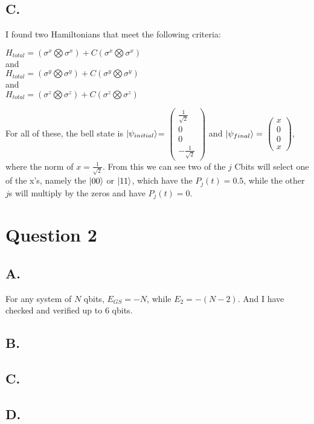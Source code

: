 \documentclass[12pt]{article}
\begin{document}
\subsection*{C.}
I found two Hamiltonians that meet the following criteria:
\begin{center}
    $H_{total} = (\sigma^x \bigotimes \sigma^x) + C (\sigma^x \bigotimes \sigma^x)$\\
    and\\
    $H_{total} = (\sigma^y \bigotimes \sigma^y) + C (\sigma^y \bigotimes \sigma^y)$\\
    and\\
    $H_{total} = (\sigma^z \bigotimes \sigma^z) + C (\sigma^z \bigotimes \sigma^z)$
\end{center}
For all of these, the bell state is $\ket{\psi_{initial}}$=
$
\begin{pmatrix} 
    \frac{1}{\sqrt{2}} \\ 0 \\ 0 \\ -\frac{1}{\sqrt{2}}
\end{pmatrix}
$
and $\ket{\psi_{final}}=$
$
\begin{pmatrix} 
    x \\ 0 \\ 0 \\ x
\end{pmatrix}
$, where the norm of $x=\frac{1}{\sqrt{2}}$.
From this we can see two of the $j$ Cbits will select one of the x's, namely the $\ket{00}$ or $\ket{11}$, which have the $P_j(t)=0.5$, while the other $j$s will multiply by the zeros and have $P_j(t)=0$.

\section*{Question 2}
\subsection*{A.}
 For any system of $N$ qbits, $E_{GS}=-N$, while $E_2=-(N-2)$.
 And I have checked and verified up to 6 qbits. 
 
\subsection*{B.}

\subsection*{C.}
\subsection*{D.}
\end{document}
